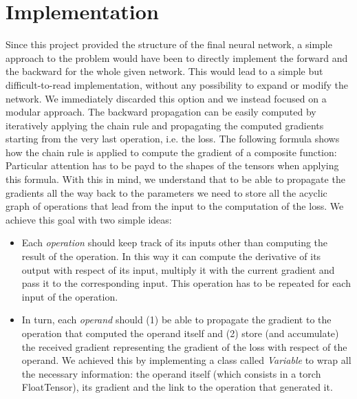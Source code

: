 \documentclass[10pt,conference,compsocconf]{IEEEtran}
\begin{document}
\section{Implementation}
Since this project provided the structure of the final neural network, a simple approach to the problem would have been to directly implement the forward and the backward for the whole given network. This would lead to a simple but difficult-to-read implementation, without any possibility to expand or modify the network. We immediately discarded this option and we instead focused on a modular approach.
The backward propagation can be easily computed by iteratively applying the chain rule and propagating the computed gradients starting from the very last operation, i.e. the loss. The following formula shows how the chain rule is applied to compute the gradient of a composite function:
Particular attention has to be payd to the shapes of the tensors when applying this formula. With this in mind, we understand that to be able to propagate the gradients all the way back to the parameters we need to store all the acyclic graph of operations that lead from the input to the computation of the loss. We achieve this goal with two simple ideas:
\begin{itemize}
    \item Each \textit{operation} should keep track of its inputs other than computing the result of the operation. In this way it can compute the derivative of its output with respect of its input, multiply it with the current gradient and pass it to the corresponding input. This operation has to be repeated for each input of the operation.
    \item In turn, each \textit{operand} should (1) be able to propagate the gradient to the operation that computed the operand itself and (2) store (and accumulate) the received gradient representing the gradient of the loss with respect of the operand. We achieved this by implementing a class called \textit{Variable} to wrap all the necessary information: the operand itself (which consists in a torch FloatTensor), its gradient and the link to the operation that generated it.
\end{itemize}
\end{document}
